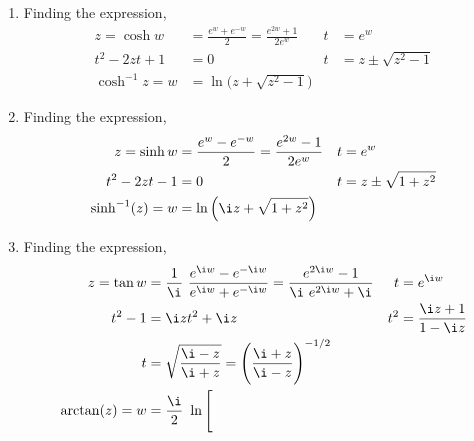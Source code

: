 \begin{enumerate}
\begin{enumerate}
              \item Finding the expression,
                    \begin{align}
                        z = \cosh w      & = \frac{e^{w} + e^{-w}}{2}
                        = \frac{e^{2w} + 1}
                        {2e^{w}}         &
                        t                & = e^{w}                               \\
                        t^2 - 2zt + 1    & = 0                                 &
                        t                & = z \pm \sqrt{z^2 - 1}                \\
                        \cosh^{-1} z = w & = \ln\Big( z + \sqrt{z^2 - 1} \Big)
                    \end{align}
              \item Finding the expression,
                    \begin{align}
                        z = \sinh w       & = \frac{e^{w} - e^{-w}}{2}
                        = \frac{e^{2w} - 1}
                        {2e^{w}}          &
                        t                 & = e^{w}                            \\
                        t^2 - 2zt - 1     & = 0                              &
                        t                 & = z \pm \sqrt{1 + z^2}             \\
                        \sinh^{-1}(z) = w & = \ln\Big( \i z + \sqrt{1 + z^2}
                        \Big)
                    \end{align}
              \item Finding the expression,
                    \begin{align}
                        z = \tan w           & = \frac{1}{\i}\
                        \frac{e^{\i w} - e^{-\i w}}{e^{\i w} + e^{-\i w}}
                        = \frac{e^{2\i w} - 1}
                        {\i\ e^{2\i w} + \i} &
                        t                    & = e^{\i w}                       \\
                        t^2 - 1              & = \i zt^2 + \i z               &
                        t^2                  & = \frac{\i z + 1}{1 - \i z}      \\
                        t                    & = \sqrt{\frac{\i - z}{\i + z}}
                        = \Bigg( \frac{\i + z}{\i - z} \Bigg)^{-1/2}            \\
                        \arctan(z) = w       & = \frac{\i}{2}\ \ln\Bigg[

\end{align}
\end{enumerate}
\end{enumerate}
